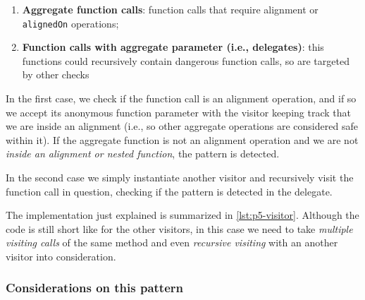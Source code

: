 \documentclass[12pt,a4paper,openright,twoside]{book}
\begin{document}
\begin{enumerate}
  \item \textbf{Aggregate function calls}: function calls that require alignment
  or \lstinline{alignedOn} operations;
  \item \textbf{Function calls with aggregate parameter (i.e., delegates)}: this 
  functions could recursively contain dangerous function calls, so are targeted 
  by other checks
\end{enumerate}

In the first case, we check if the function call is an alignment operation, and if
so we accept its anonymous function parameter with the visitor keeping track that 
we are inside an alignment (i.e., so other aggregate operations are considered safe
within it). If the aggregate function is not an alignment operation and we are not
\emph{inside an alignment or nested function}, the pattern is detected.

In the second case we simply instantiate another visitor and recursively visit the
function call in question, checking if the pattern is detected in the delegate.

The implementation just explained is summarized in \cref{lst:p5-visitor}.
Although the code is still short like for the other visitors, in this case we
need to take \emph{multiple visiting calls} of the same method and even
\emph{recursive visiting} with an another visitor into consideration.

\subsubsection{Considerations on this pattern}
\end{document}
